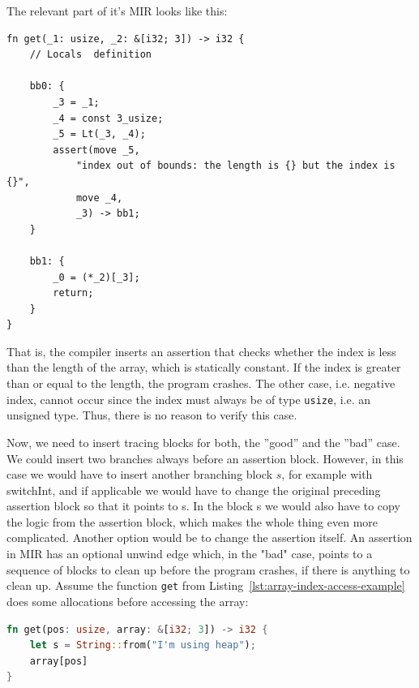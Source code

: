 \documentclass{article}
\begin{document}
The relevant part of it's \ac{MIR} looks like this:
\begin{lstlisting}[language={}, style=boxed, caption={}, label=lst:mir-boundary-check]
fn get(_1: usize, _2: &[i32; 3]) -> i32 {
    // Locals  definition

    bb0: {
        _3 = _1;
        _4 = const 3_usize;
        _5 = Lt(_3, _4);
        assert(move _5,
            "index out of bounds: the length is {} but the index is {}",
            move _4,
            _3) -> bb1;
    }

    bb1: {
        _0 = (*_2)[_3];
        return;
    }
}
\end{lstlisting}

That is, the compiler inserts an assertion that checks whether the index is less than the length of the array, which is statically constant. If the index is greater than or equal to the length, the program crashes. The other case, i.e. negative index, cannot occur since the index must always be of type \lstinline{usize}, i.e. an unsigned type. Thus, there is no reason to verify this case.

Now, we need to insert tracing blocks for both, the ''good'' and the ''bad'' case. We could insert two branches always before an assertion block. However, in this case we would have to insert another branching block $s$, for example with switchInt, and if applicable we would have to change the original preceding assertion block so that it points to s. In the block s we would also have to copy the logic from the assertion block, which makes the whole thing even more complicated. Another option would be to change the assertion itself. An assertion in MIR has an optional unwind edge which, in the "bad" case, points to a sequence of blocks to clean up before the program crashes, if there is anything to clean up. Assume the function \lstinline{get} from Listing~\ref{lst:array-index-access-example} does some allocations before accessing the array:
\begin{lstlisting}[language=Rust, style=boxed, caption={}]
fn get(pos: usize, array: &[i32; 3]) -> i32 {
    let s = String::from("I'm using heap");
    array[pos]
}
\end{lstlisting}
\end{document}
